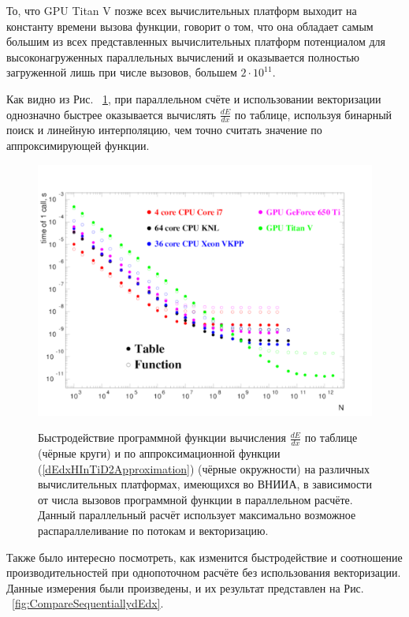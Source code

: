 \documentclass[a4paper,12pt]{article}
\begin{document}
\begin{large}
	То, что GPU Titan V позже всех вычислительных платформ выходит на константу времени вызова функции, говорит о том, что она обладает самым большим из всех представленных вычислительных платформ потенциалом для высоконагруженных параллельных вычислений и оказывается полностью загруженной лишь при числе вызовов, большем $2 \cdot 10^{11}$. 
	 
	Как видно из Рис. ~\ref{fig:CompareParallellydEdx}, при параллельном счёте и использовании векторизации однозначно быстрее оказывается вычислять $\frac{dE}{dx}$ по таблице, используя бинарный поиск и линейную интерполяцию, чем точно считать значение по аппроксимирующей функции.
	 

\begin{figure}[ht]
  {
     \includegraphics[width=0.99\linewidth]{images/compare_parallelly_dEdx.pdf}
  }
  \caption{Быстродействие программной функции вычисления $\frac{dE}{dx}$ по таблице (чёрные круги) и по аппроксимационной функции (\ref{dEdxHInTiD2Approximation}) (чёрные окружности) на различных вычислительных платформах, имеющихся во ВНИИА, в зависимости от числа вызовов программной функции в параллельном расчёте. Данный параллельный расчёт использует максимально возможное распараллеливание по потокам и векторизацию.}
  \label{fig:CompareParallellydEdx}
\end{figure}

	Также было интересно посмотреть, как изменится быстродействие и соотношение производительностей при однопоточном расчёте без использования векторизации.
	Данные измерения были произведены, и их результат представлен на Рис. ~\ref{fig:CompareSequentiallydEdx}.
	

\end{large}
\end{document}
